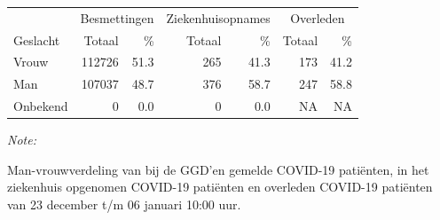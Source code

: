 \documentclass[
  english,
  man,floatsintext]{apa6}
\begin{document}
\begin{table}
\centering\begingroup\fontsize{11}{13}\selectfont

\begin{threeparttable}
\begin{tabular}{lrrrrrr}
\toprule
\multicolumn{1}{c}{ } & \multicolumn{2}{c}{Besmettingen} & \multicolumn{2}{c}{Ziekenhuisopnames} & \multicolumn{2}{c}{Overleden} \\
\cmidrule(l{3pt}r{3pt}){2-3} \cmidrule(l{3pt}r{3pt}){4-5} \cmidrule(l{3pt}r{3pt}){6-7}
Geslacht & Totaal & \% & Totaal & \% & Totaal & \%\\
\midrule
Vrouw & 112726 & 51.3 & 265 & 41.3 & 173 & 41.2\\
Man & 107037 & 48.7 & 376 & 58.7 & 247 & 58.8\\
Onbekend & 0 & 0.0 & 0 & 0.0 & NA & NA\\
\bottomrule
\end{tabular}
\begin{tablenotes}
\item \textit{Note: } 
\item Man-vrouwverdeling van bij de GGD’en gemelde COVID-19 patiënten, in het ziekenhuis opgenomen COVID-19 patiënten en overleden COVID-19 patiënten van 23 december t/m 06 januari 10:00 uur.
\end{tablenotes}
\end{threeparttable}
\endgroup{}
\end{table}
\newpage
\end{document}
